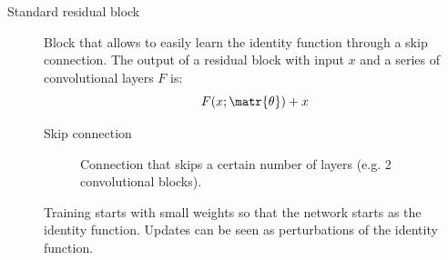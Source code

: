 \begin{description}
    \item[Standard residual block] 
        Block that allows to easily learn the identity function through a skip connection.
        The output of a residual block with input $x$ and a series of convolutional layers $F$ is:
        \[ F(x; \matr{\theta}) + x \]

        \begin{minipage}{0.75\linewidth}
            \begin{description}
                \item[Skip connection] 
                    Connection that skips a certain number of layers (e.g. 2 convolutional blocks).
            \end{description}
    
            \begin{remark}
                Training starts with small weights so that the network starts as the identity function. Updates can be seen as perturbations of the identity function.
            \end{remark}
    

\end{minipage}
\end{description}
